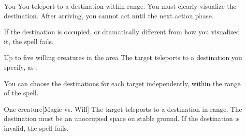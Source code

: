 \begin{spellheader}
    \spellrng{\rngext \rngunrestricted}
\end{spellheader}
\begin{spelleffects}
    \begin{spelltarget}{You}
        \spelleffect You teleport to a destination within range. You must clearly visualize the destination. After arriving, you cannot act until the next action phase.

        If the destination is occupied, or dramatically different from how you visualized it, the spell fails.
    \end{spelltarget}
\end{spelleffects}

\begin{spellheader}
\end{spellheader}
\begin{spelleffects}
    \begin{spelltarget}{Up to five willing creatures in the area}
        \spelleffect The target teleports to a destination you specify, as .
    \end{spelltarget}
\end{spelleffects}
\begin{spellfooter}
    \spellnotes You can choose the destinations for each target independently, within the range of the spell. 
\end{spellfooter}

\begin{spellheader}
    \spellrng{\rngmed}
\end{spellheader}
\begin{spelleffects}
    \begin{spelltarget}{One creature}[Magic vs. Will]
        \spelleffect The target teleports to a destination in range. The destination must be an unoccupied space on stable ground. If the destination is invalid, the spell fails.
    \end{spelltarget}
\end{spelleffects}

